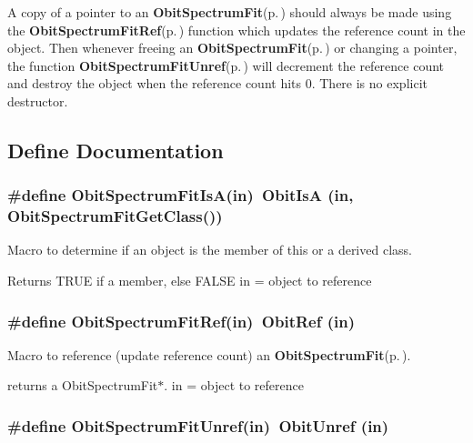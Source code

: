 A copy of a pointer to an {\bf Obit\-Spectrum\-Fit}{\rm (p.\,\pageref{structObitSpectrumFit})} should always be made using the {\bf Obit\-Spectrum\-Fit\-Ref}{\rm (p.\,\pageref{ObitSpectrumFit_8h_a1})} function which updates the reference count in the object. Then whenever freeing an {\bf Obit\-Spectrum\-Fit}{\rm (p.\,\pageref{structObitSpectrumFit})} or changing a pointer, the function {\bf Obit\-Spectrum\-Fit\-Unref}{\rm (p.\,\pageref{ObitSpectrumFit_8h_a0})} will decrement the reference count and destroy the object when the reference count hits 0. There is no explicit destructor.

\subsection{Define Documentation}
\subsubsection{\setlength{\rightskip}{0pt plus 5cm}\#define Obit\-Spectrum\-Fit\-Is\-A(in)\ Obit\-Is\-A (in, Obit\-Spectrum\-Fit\-Get\-Class())}\label{ObitSpectrumFit_8h_a2}


Macro to determine if an object is the member of this or a derived class. 

Returns TRUE if a member, else FALSE in = object to reference 
\subsubsection{\setlength{\rightskip}{0pt plus 5cm}\#define Obit\-Spectrum\-Fit\-Ref(in)\ Obit\-Ref (in)}\label{ObitSpectrumFit_8h_a1}


Macro to reference (update reference count) an {\bf Obit\-Spectrum\-Fit}{\rm (p.\,\pageref{structObitSpectrumFit})}. 

returns a Obit\-Spectrum\-Fit$\ast$. in = object to reference 
\subsubsection{\setlength{\rightskip}{0pt plus 5cm}\#define Obit\-Spectrum\-Fit\-Unref(in)\ Obit\-Unref (in)}\label{ObitSpectrumFit_8h_a0}


